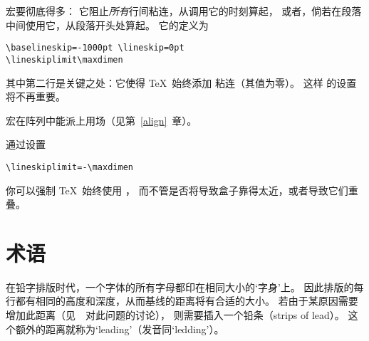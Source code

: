 \documentclass{book}
\begin{document}
 宏要彻底得多：
它阻止{\sl 所有\/}行间粘连，从调用它的时刻算起，
或者，倘若在段落中间使用它，从段落开头处算起。
它的定义为
\begin{verbatim}
\baselineskip=-1000pt \lineskip=0pt 
\lineskiplimit\maxdimen
\end{verbatim}
其中第二行是关键之处：它使得 \TeX\ 始终添加  粘连（其值为零）。
这样  的设置将不再重要。

 宏在阵列中能派上用场（见第~\ref{align}~章）。

通过设置
\begin{verbatim}
\lineskiplimit=-\maxdimen
\end{verbatim}
你可以强制 \TeX\ 始终使用 ，
而不管是否将导致盒子靠得太近，或者导致它们重叠。


\section{术语}

在铅字排版时代，一个字体的所有字母都印在相同大小的`字身'上。
因此排版的每行都有相同的高度和深度，从而基线的距离将有合适的大小。
若由于某原因需要增加此距离（见~\cite{White:line}~对此问题的讨论），
则需要插入一个铅条（strips of lead）。
这个额外的距离就称为`leading'（发音同`ledding'）。
\end{document}
